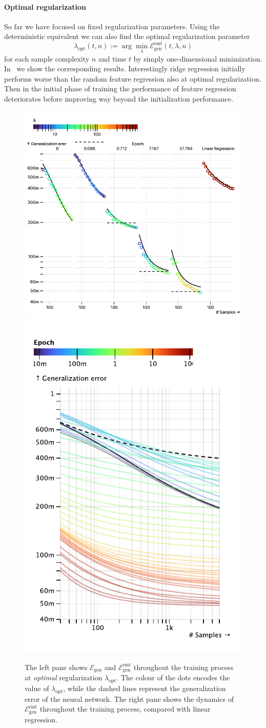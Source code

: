 \paragraph{Optimal regularization}
So far we have focused on fixed regularization parameters. Using the deterministic equivalent we can also find the optimal regularization parameter \begin{equation}
    \lambda_\mathrm{opt}(t,n) := \arg\min_\lambda \mathcal E_\mathrm{gen}^\mathrm{rmt}(t,\lambda,n) 
\end{equation} 
for each sample complexity $n$ and time $t$ by simply one-dimensional minimization. In~ we show the corresponding results. Interestingly ridge regression initially performs worse than the random feature regression also at optimal regularization. Then in the initial phase of training the performance of feature regression deteriorates before improving way beyond the initialization performance.   
\begin{figure}
    \centering
    \includegraphics[width=.6\linewidth]{chapters/deeprf/figs/real_opt_emp.pdf}
    \includegraphics[width=.37\linewidth]{chapters/deeprf/figs/real_opt_det.pdf}
    \caption{The left pane shows $\mathcal E_\mathrm{gen}$ and $\mathcal E_\mathrm{gen}^\mathrm{rmt}$ throughout the training process at \emph{optimal} regularization $\lambda_\mathrm{opt}$. The colour of the dots encodes the value of $\lambda_\mathrm{opt}$, while the dashed lines represent the generalization error of the neural network. The right pane shows the dynamics of $\mathcal E_\mathrm{gen}^\mathrm{rmt}$ throughout the training process, compared with linear regression.}
    \label{fig:real_opt}
\end{figure}

